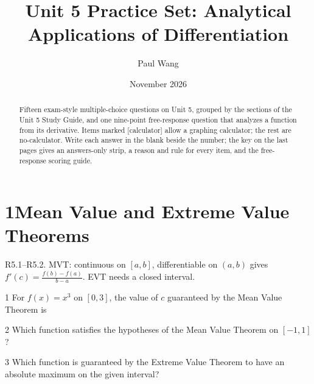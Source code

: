 \documentclass{apcalc}
\title{Unit 5 Practice Set: Analytical Applications of Differentiation}
\author{Paul Wang}
\date{November 2026}
\begin{document}
\maketitle
\begin{abstract}
Fifteen exam-style multiple-choice questions on Unit 5, grouped by the sections of the Unit 5 Study Guide, and one nine-point free-response question that analyzes a function from its derivative. Items marked [calculator] allow a graphing calculator; the rest are no-calculator. Write each answer in the blank beside the number; the key on the last pages gives an answers-only strip, a reason and rule for every item, and the free-response scoring guide.
\end{abstract}
\section*{1\quad Mean Value and Extreme Value Theorems}
\begin{setrule}R5.1–R5.2. MVT: continuous on $[a,b]$, differentiable on $(a,b)$ gives $f'(c)=\frac{f(b)-f(a)}{b-a}$. EVT needs a closed interval.\end{setrule}
\begin{q}{1}
For $f(x)=x^3$ on $[0,3]$, the value of $c$ guaranteed by the Mean Value Theorem is
\end{q}
\begin{q}{2}
Which function satisfies the hypotheses of the Mean Value Theorem on $[-1,1]$?
\end{q}
\begin{q}{3}
Which function is guaranteed by the Extreme Value Theorem to have an absolute maximum on the given interval?
\chtwo{$\dfrac1x$ on $(0,1]$}{$\tan x$ on $\left[0,\frac\pi2\right)$}{$x^2$ on $(-1,2)$}{$\cos x$ on $[0,5]$}
\end{q}
\end{document}
